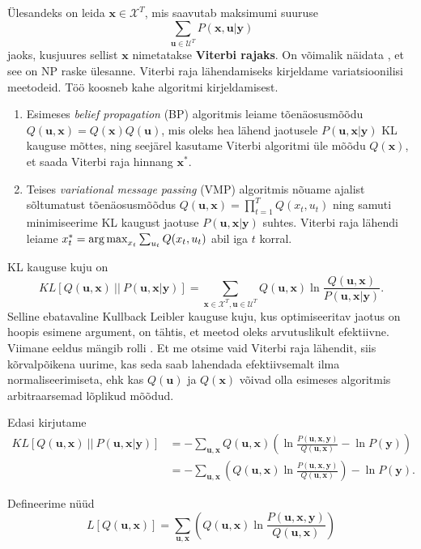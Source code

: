 Ülesandeks on leida $\bm{x} \in \mathcal{X}^T$, mis saavutab maksimumi suuruse 
$$\sum_{\bm{u} \in \mathcal{U}^T}{P(\bm{x}, \bm{u} | \bm{y})}$$
jaoks, kusjuures sellist $\mathbf{x}$ nimetatakse \textbf{Viterbi rajaks}. On võimalik näidata \parencite{LYNGSO2002545}, et see on NP raske ülesanne. Viterbi raja lähendamiseks kirjeldame variatsioonilisi meetodeid. Töö koosneb kahe algoritmi kirjeldamisest.
\begin{enumerate}
    \item Esimeses \emph{belief propagation} (BP) algoritmis leiame tõenäosusmõõdu $Q(\bm{u}, \bm{x}) = Q(\bm{x})Q(\bm{u})$, mis oleks hea lähend jaotusele $P(\bm{u},\bm{x} | \bm{y})$ KL kauguse mõttes, ning seejärel kasutame Viterbi algoritmi üle mõõdu $Q(\bm{x})$, et saada Viterbi raja hinnang $\bm{x}^*$.
    \item Teises \emph{variational message passing} (VMP) algoritmis nõuame ajalist sõltumatust tõenäosusmõõdus $Q(\bm{u}, \bm{x}) = \prod_{t=1}^T Q(x_t,u_t)$ ning samuti minimiseerime KL kaugust jaotuse $P(\bm{u},\bm{x} | \bm{y})$ suhtes. Viterbi raja lähendi leiame $x_t^* = \operatorname*{arg\,max}_{x_t} \sum_{u_t} Q(x_t,u_t)$ abil iga $t$ korral.
\end{enumerate}

KL kauguse kuju on
$$KL[Q(\bm{u}, \bm{x}) \ ||\ P(\bm{u}, \bm{x} | \bm{y})] = \sum_{\bm{x} \in \mathcal{X}^T, \bm{u} \in \mathcal{U}^T} Q(\bm{u}, \bm{x}) \ln \frac{Q(\bm{u}, \bm{x})}{P(\bm{u}, \bm{x} | \bm{y})}.$$
Selline ebatavaline Kullback Leibler kauguse kuju, kus optimiseeritav jaotus on hoopis esimene argument, on tähtis, et meetod oleks arvutuslikult efektiivne. Viimane eeldus mängib rolli \bla. Et me otsime vaid Viterbi raja lähendit, siis kõrvalpõikena uurime, kas seda saab lahendada efektiivsemalt ilma normaliseerimiseta, ehk kas $Q(\bm{u})$ ja $Q(\bm{x})$ võivad olla esimeses algoritmis arbitraarsemad lõplikud mõõdud. 

Edasi kirjutame 
\begin{align}
    \label{eq:kl}
    KL[Q(\bm{u}, \bm{x}) \ ||\ P(\bm{u}, \bm{x} | \bm{y})] &= - \sum_{\bm{u}, \bm{x}} Q(\bm{u}, \bm{x}) \left( \ln \frac{P(\bm{u}, \bm{x}, \bm{y})}{Q(\bm{u}, \bm{x})} - \ln P(\bm{y}) \right) \\
    \nonumber
    &= - \sum_{\bm{u}, \bm{x}} \left( Q(\bm{u}, \bm{x}) \ln \frac{P(\bm{u}, \bm{x}, \bm{y})}{Q(\bm{u}, \bm{x})}\right) - \ln P(\bm{y}).
\end{align}

Defineerime nüüd
\begin{equation}
\label{eq:elbo}
L[Q(\bm{u}, \bm{x})] = \sum_{\bm{u}, \bm{x}} \left( Q(\bm{u}, \bm{x}) \ln \frac{P(\bm{u}, \bm{x}, \bm{y})}{Q(\bm{u}, \bm{x})}\right)
\end{equation}

